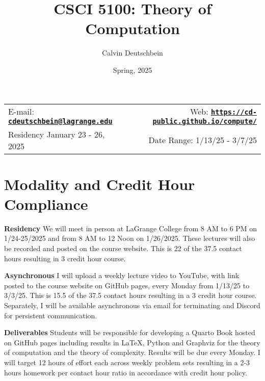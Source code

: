 \documentclass[11pt]{article}
\title{CSCI 5100: Theory of Computation}
\author{Calvin Deutschbein}
\date{Spring, 2025}
\newcommand{\blankline}{\quad\pagebreak[2]}
\begin{document}
\maketitle

\blankline

\begin{tabular*}{.93\textwidth}{@{\extracolsep{\fill}}lr}


E-mail: \href{mailto:cdeutschbein@lagrange.edu}{\tt\bf cdeutschbein@lagrange.edu} & Web: \href{https://cd-public.github.io/compute/}{\tt\bf https://cd-public.github.io/compute/}  \\

Residency January 23 - 26, 2025  &  Date Range: 1/13/25 - 3/7/25 \\
\hline
\end{tabular*}

\vspace{5 mm}


\section*{Modality and Credit Hour Compliance}

\textbf{Residency} We will meet in person at LaGrange College from 8 AM to 6 PM on 1/24-25/2025 and from 8 AM to 12 Noon on 1/26/2025. These lectures will also be recorded and posted on the course website. This is 22 of the 37.5 contact hours resulting in 3 credit hour course.

\bigskip

\textbf{Asynchronous} I will upload a weekly lecture video to YouTube, with link posted to the course website on GitHub pages, every Monday from 1/13/25 to 3/3/25. This is 15.5 of the 37.5 contact hours resulting in a 3 credit hour course.  Separately, I will be available asynchronous via email for terminating and Discord for persistent communication.

\bigskip

\textbf{Deliverables} Students will be responsible for developing a Quarto Book hosted on GitHub pages including results in LaTeX, Python and Graphviz for the theory of computation and the theory of complexity. Results will be due every Monday. I will target 12 hours of effort each across weekly problem sets resulting in a 2-3 hours homework per contact hour ratio in accordance with credit hour policy.
\end{document}
